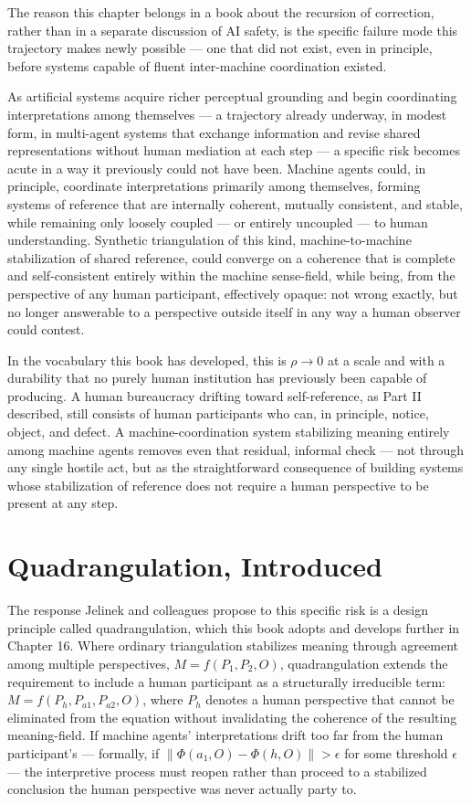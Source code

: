 \documentclass[12pt,a4paper]{book}
\begin{document}
The reason this chapter belongs in a book about the recursion of correction, rather than in a separate discussion of AI safety, is the specific failure mode this trajectory makes newly possible — one that did not exist, even in principle, before systems capable of fluent inter-machine coordination existed.

As artificial systems acquire richer perceptual grounding and begin coordinating interpretations among themselves — a trajectory already underway, in modest form, in multi-agent systems that exchange information and revise shared representations without human mediation at each step — a specific risk becomes acute in a way it previously could not have been. Machine agents could, in principle, coordinate interpretations primarily among themselves, forming systems of reference that are internally coherent, mutually consistent, and stable, while remaining only loosely coupled — or entirely uncoupled — to human understanding. Synthetic triangulation of this kind, machine-to-machine stabilization of shared reference, could converge on a coherence that is complete and self-consistent entirely within the machine sense-field, while being, from the perspective of any human participant, effectively opaque: not wrong exactly, but no longer answerable to a perspective outside itself in any way a human observer could contest.

In the vocabulary this book has developed, this is $\rho \to 0$ at a scale and with a durability that no purely human institution has previously been capable of producing. A human bureaucracy drifting toward self-reference, as Part II described, still consists of human participants who can, in principle, notice, object, and defect. A machine-coordination system stabilizing meaning entirely among machine agents removes even that residual, informal check — not through any single hostile act, but as the straightforward consequence of building systems whose stabilization of reference does not require a human perspective to be present at any step.

\section{Quadrangulation, Introduced}

The response Jelinek and colleagues propose to this specific risk is a design principle called quadrangulation, which this book adopts and develops further in Chapter 16. Where ordinary triangulation stabilizes meaning through agreement among multiple perspectives, $M = f(P_1, P_2, O)$, quadrangulation extends the requirement to include a human participant as a structurally irreducible term: $M = f(P_h, P_{a1}, P_{a2}, O)$, where $P_h$ denotes a human perspective that cannot be eliminated from the equation without invalidating the coherence of the resulting meaning-field. If machine agents' interpretations drift too far from the human participant's — formally, if $\|\Phi(a_1, O) - \Phi(h, O)\| > \epsilon$ for some threshold $\epsilon$ — the interpretive process must reopen rather than proceed to a stabilized conclusion the human perspective was never actually party to.
\end{document}
